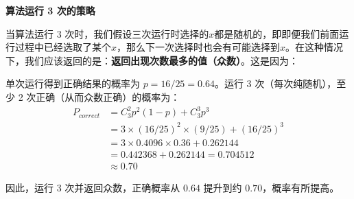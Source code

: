 \documentclass[UTF8,12pt,a4paper]{ctexart}
\begin{document}
\begin{enumerate}[1.]
	\textbf{算法运行 3 次的策略}
	
	当算法运行 3 次时，我们假设三次运行时选择的$x$都是随机的，即即便我们前面运行过程中已经选取了某个$x$，那么下一次选择时也会有可能选择到$x$。在这种情况下，我们应该返回的是：\textbf{返回出现次数最多的值（众数）}。这是因为：
	
	单次运行得到正确结果的概率为 $p = 16/25 = 0.64$。运行 3 次（每次纯随机），至少 2 次正确（从而众数正确）的概率为：
	\begin{align*}
		P_{correct} & =  C_{3}^{2} p^2(1-p) + C_{3}^{3} p^3 \\
		& = 3 \times (16/25)^2 \times (9/25) + (16/25)^3 \\ 
		& = 3 \times 0.4096 \times 0.36 + 0.262144 \\
		& = 0.442368 + 0.262144 = 0.704512  \\
		& \approx 0.70
	\end{align*}

	因此，运行 3 次并返回众数，正确概率从 $0.64$ 提升到约 $0.70$，概率有所提高。

\end{enumerate}
\end{document}
